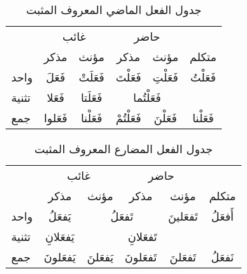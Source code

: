 \documentclass[../main.tex]{subfiles}
\begin{document}
\begin{table}[h]
\centering
\begin{tabular}{lccccc}
                           & \multicolumn{2}{c}{غائب}                                     & \multicolumn{2}{c}{حاضر}                                        & \multicolumn{1}{l}{}          \\
                           & مذكر                         & مؤنث                          & مذكر                            & مؤنث                          & متكلم                         \\ \cline{2-6} 
\multicolumn{1}{l|}{واحد}  & \multicolumn{1}{c|}{فَعَلَ}  & \multicolumn{1}{c|}{فَعَلَتْ} & \multicolumn{1}{c|}{فَعَلْتَ}   & \multicolumn{1}{c|}{فَعَلْتِ} & \multicolumn{1}{c|}{فَعَلْتُ} \\ \cline{2-6} 
\multicolumn{1}{l|}{تثنية} & \multicolumn{1}{c|}{فَعَلا}  & \multicolumn{1}{c|}{فَعَلَتا} & \multicolumn{2}{c|}{فَعَلْتُما}                                 & \multicolumn{1}{c|}{}         \\ \cline{2-6} 
\multicolumn{1}{l|}{جمع}   & \multicolumn{1}{c|}{فَعَلوا} & \multicolumn{1}{c|}{فَعَلْنا} & \multicolumn{1}{c|}{فَعَلْتُمْ} & \multicolumn{1}{c|}{فَعَلْنَ} & \multicolumn{1}{c|}{فَعَلْنا} \\ \cline{2-6} 
\end{tabular}
\caption{جدول الفعل الماضي المعروف المثبت}
\label{table:1}
\end{table}

\begin{table}[h]
\centering
\begin{tabular}{lccccc}
                           & \multicolumn{2}{c}{غائب}                                       & \multicolumn{2}{c}{حاضر}                                        & \multicolumn{1}{l}{}         \\
                           & مذكر                           & مؤنث                          & مذكر                           & مؤنث                           & متكلم                        \\ \cline{2-6} 
\multicolumn{1}{l|}{واحد}  & \multicolumn{1}{c|}{يَفعَلُ}   & \multicolumn{2}{c|}{تَفعَلُ}                                   & \multicolumn{1}{c|}{تَفعَلينَ} & \multicolumn{1}{c|}{أَفعَلُ} \\ \cline{2-6} 
\multicolumn{1}{l|}{تثنية} & \multicolumn{1}{c|}{يَفعَلانِ} & \multicolumn{3}{c|}{تَفعَلانِ}                                                                  & \multicolumn{1}{c|}{}        \\ \cline{2-6} 
\multicolumn{1}{l|}{جمع}   & \multicolumn{1}{c|}{يَفعَلونَ} & \multicolumn{1}{c|}{يَفعَلنَ} & \multicolumn{1}{c|}{تَفعَلونَ} & \multicolumn{1}{c|}{تَفعَلنَ}  & \multicolumn{1}{c|}{نَفعَلُ} \\ \cline{2-6} 
\end{tabular}
\caption{جدول الفعل المضارع المعروف المثبت}
\label{table:2}
\end{table}
\end{document}
